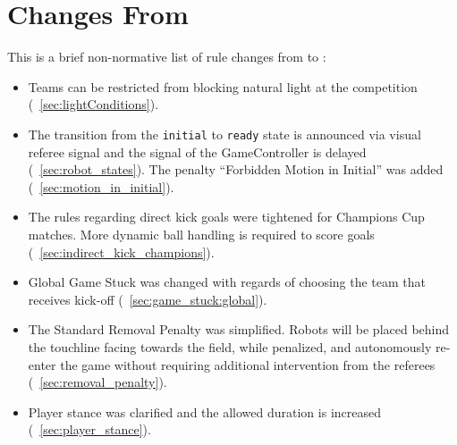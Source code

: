 \section{Changes From \LastRCYear}

This is a brief non-normative list of rule changes from \LastRCYear to \RCYear:
\begin{itemize}
  \item Teams can be restricted from blocking natural light at the competition (\cf~\cref{sec:lightConditions}).
  \item The transition from the \texttt{initial} to \texttt{ready} state is announced via visual referee signal and the signal of the GameController is delayed (\cf~\cref{sec:robot_states}). The penalty ``Forbidden Motion in Initial'' was added (\cf~\cref{sec:motion_in_initial}).
  \item The rules regarding direct kick goals were tightened for Champions Cup matches. More dynamic ball handling is required to score goals (\cf~\cref{sec:indirect_kick_champions}).
  \item Global Game Stuck was changed with regards of choosing the team that receives kick-off (\cf~\cref{sec:game_stuck:global}).
  \item The Standard Removal Penalty was simplified. Robots will be placed behind the touchline facing towards the field, while penalized, and autonomously re-enter the game without requiring additional intervention from the referees (\cf~\cref{sec:removal_penalty}).
  \item Player stance was clarified and the allowed duration is increased (\cf~\cref{sec:player_stance}).
\end{itemize}
